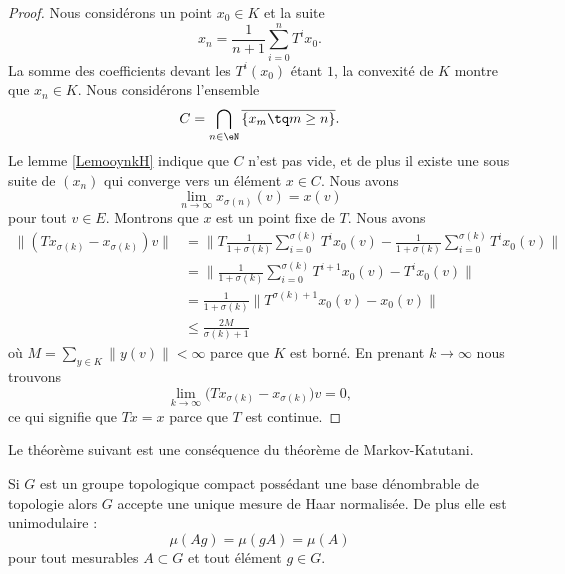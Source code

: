 \begin{proof}
    Nous considérons un point \( x_0\in K\) et la suite
    \begin{equation}
        x_n=\frac{1}{ n+1 }\sum_{i=0}^n T^ix_0.
    \end{equation}
    La somme des coefficients devant les \( T^i(x_0)\) étant \( 1\), la convexité de \( K\) montre que \( x_n\in K\). Nous considérons l'ensemble
    \begin{equation}
        C=\bigcap_{n\in \eN}\overline{ \{ x_m\tq m\geq n \} }.
    \end{equation}
    Le lemme \ref{LemooynkH} indique que \( C\) n'est pas vide, et de plus il existe une sous suite de \( (x_n)\) qui converge vers un élément \( x\in C\). Nous avons
    \begin{equation}
        \lim_{n\to \infty} x_{\sigma(n)}(v)=x(v)
    \end{equation}
    pour tout \( v\in E\). Montrons que \( x\) est un point fixe de \( T\). Nous avons
    \begin{subequations}
        \begin{align}
            \| (Tx_{\sigma(k)}-x_{\sigma(k)})v \|&=\Big\| T\frac{1}{ 1+\sigma(k) }\sum_{i=0}^{\sigma(k)}T^ix_0(v)-\frac{1}{ 1+\sigma(k) }\sum_{i=0}^{\sigma(k)}T^ix_0(v) \Big\|\\
            &=\Big\| \frac{1}{ 1+\sigma(k) }\sum_{i=0}^{\sigma(k)}T^{i+1}x_0(v)-T^ix_0(v) \Big\|\\
            &=\frac{1}{ 1+\sigma(k) }\big\| T^{\sigma(k)+1}x_0(v)-x_0(v) \big\|\\
            &\leq\frac{ 2M }{ \sigma(k)+1 }
        \end{align}
    \end{subequations}
    où \( M=\sum_{y\in K}\| y(v) \|<\infty\) parce que \( K\) est borné. En prenant \( k\to\infty\) nous trouvons
    \begin{equation}
        \lim_{k\to \infty} \big( Tx_{\sigma(k)}-x_{\sigma(k)} \big)v=0,
    \end{equation}
    ce qui signifie que \( Tx=x\) parce que \( T\) est continue.
\end{proof}

Le théorème suivant est une conséquence du théorème de Markov-Katutani.
\begin{theorem}
    Si \( G\) est un groupe topologique compact possédant une base dénombrable de topologie alors \( G\) accepte une unique mesure de Haar normalisée. De plus elle est unimodulaire :
    \begin{equation}
        \mu(Ag)=\mu(gA)=\mu(A)
    \end{equation}
    pour tout mesurables \( A\subset G\) et tout élément \( g\in G\).
\end{theorem}


